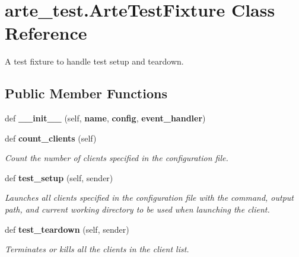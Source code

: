 \section{arte\+\_\+test.\+Arte\+Test\+Fixture Class Reference}
\label{classarte__test_1_1_arte_test_fixture}


A test fixture to handle test setup and teardown.  


\subsection*{Public Member Functions}
\begin{DoxyCompactItemize}
\item 
def {\bfseries \+\_\+\+\_\+init\+\_\+\+\_\+} (self, {\bf name}, {\bf config}, {\bf event\+\_\+handler})\label{classarte__test_1_1_arte_test_fixture_a619a89b940d44328e2625532f29275f9}

\item 
def {\bf count\+\_\+clients} (self)
\begin{DoxyCompactList}\small\item\em Count the number of clients specified in the configuration file. \end{DoxyCompactList}\item 
def {\bf test\+\_\+setup} (self, sender)
\begin{DoxyCompactList}\small\item\em Launches all clients specified in the configuration file with the command, output path, and current working directory to be used when launching the client. \end{DoxyCompactList}\item 
def {\bf test\+\_\+teardown} (self, sender)
\begin{DoxyCompactList}\small\item\em Terminates or kills all the clients in the client list. \end{DoxyCompactList}\end{DoxyCompactItemize}

